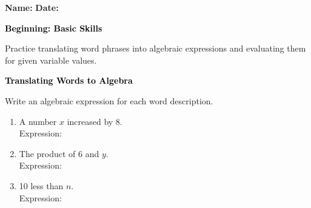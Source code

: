 \documentclass[12pt, letterpaper, fleqn]{article}
\newcommand{\blanklong}{\underline{\hspace{6.5cm}}}
\begin{document}
\textbf{Name:} \underline{\hspace{5cm}}
\hfill
\textbf{Date:} \underline{\hspace{3cm}}\\

\begin{tcolorbox}[colback=black!10]
    \large\textcolor{black}{\textbf{Beginning: Basic Skills}}
\end{tcolorbox}

\vspace{3mm}
\noindent
Practice translating word phrases into algebraic expressions and evaluating them for given variable values.

\vspace{4mm}

\begin{tcolorbox}[colback=black!10]
\large\textcolor{black}{\textbf{Translating Words to Algebra}}
\end{tcolorbox}

\noindent
Write an algebraic expression for each word description.

\vspace{3mm}

\begin{enumerate}[itemsep=2.2cm, leftmargin=0.6cm]

\item A number $x$ increased by 8. \\
Expression: \blanklong

\vspace{2cm}

\item The product of 6 and $y$. \\
Expression: \blanklong

\vspace{2cm}

\item 10 less than $n$. \\
Expression: \blanklong

\vspace{2cm}

\end{enumerate}

\newpage
\end{document}
